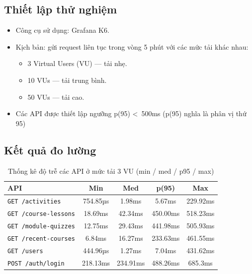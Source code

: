 \subsection{Thiết lập thử nghiệm}

\begin{itemize}
    \item Công cụ sử dụng: Grafana K6.
    \item Kịch bản: gửi request liên tục trong vòng 5 phút với các mức tải khác nhau:
    \begin{itemize}
        \item 3 Virtual Users (VU) — tải nhẹ.
        \item 10 VUs — tải trung bình.
        \item 50 VUs — tải cao.
    \end{itemize}
    \item Các API được thiết lập ngưỡng p(95) \textless~500ms (p(95) nghĩa là phân vị thứ 95)
\end{itemize}

\subsection{Kết quả đo lường}

\begin{table}[H]
\centering
\caption{Thống kê độ trễ các API ở mức tải 3 VU (min / med / p95 / max)}
\begin{tabular}{lcccc}
\toprule
\textbf{API} & \textbf{Min} & \textbf{Med} & \textbf{p(95)} & \textbf{Max} \\
\midrule
\texttt{GET /activities}         & 754.85µs & 1.98ms   & 5.67ms   & 229.92ms \\
\texttt{GET /course-lessons}     & 18.69ms  & 42.34ms  & 450.00ms & 518.23ms \\
\texttt{GET /module-quizzes}     & 12.75ms  & 29.43ms  & 441.98ms & 505.93ms \\
\texttt{GET /recent-courses}     & 6.84ms   & 16.27ms  & 233.63ms & 461.55ms \\
\texttt{GET /users}              & 444.96µs & 1.27ms   & 7.04ms   & 431.62ms \\
\texttt{POST /auth/login}        & 218.13ms & 234.91ms & 488.26ms & 685.3ms  \\
\bottomrule
\end{tabular}
\end{table}

